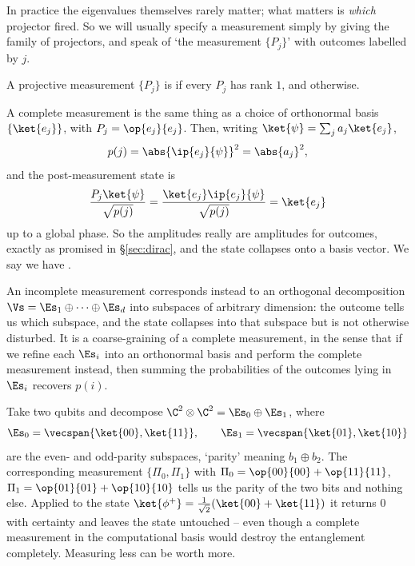 In practice the eigenvalues themselves rarely matter; what matters is \emph{which} projector fired. So we will usually specify a measurement simply by giving the family of projectors, and speak of `the measurement $\{P_j\}$' with outcomes labelled by $j$.

\begin{definition}
	A projective measurement $\{P_j\}$ is  if every $P_j$ has rank $1$, and  otherwise.
\end{definition}

A complete measurement is the same thing as a choice of orthonormal basis $\{\ket{e_j}\}$, with $P_j = \op{e_j}{e_j}$. Then, writing $\ket{\psi} = \sum_j a_j\ket{e_j}$,
$$p(j) = \abs{\ip{e_j}{\psi}}^2 = \abs{a_j}^2,$$
and the post-measurement state is
$$\frac{P_j\ket{\psi}}{\sqrt{p(j)}} = \frac{\ket{e_j}\ip{e_j}{\psi}}{\sqrt{p(j)}} = \ket{e_j}$$
up to a global phase. So the amplitudes really are amplitudes for outcomes, exactly as promised in \S\ref{sec:dirac}, and the state collapses onto a basis vector. We say we have .

An incomplete measurement corresponds instead to an orthogonal decomposition $\Vs = \Es_1 \oplus \cdots \oplus \Es_d$ into subspaces of arbitrary dimension: the outcome tells us which subspace, and the state collapses into that subspace but is not otherwise disturbed. It is a coarse-graining of a complete measurement, in the sense that if we refine each $\Es_i$ into an orthonormal basis and perform the complete measurement instead, then summing the probabilities of the outcomes lying in $\Es_i$ recovers $p(i)$.

\begin{example}
	Take two qubits and decompose $\C^2\otimes\C^2 = \Es_0 \oplus \Es_1$, where
	$$\Es_0 = \vecspan\{\ket{00},\ket{11}\}, \qquad \Es_1 = \vecspan\{\ket{01},\ket{10}\}$$
	are the even- and odd-parity subspaces, `parity' meaning $b_1 \oplus b_2$. The corresponding measurement $\{\Pi_0, \Pi_1\}$ with $\Pi_0 = \op{00}{00}+\op{11}{11}$, $\Pi_1 = \op{01}{01}+\op{10}{10}$ tells us the parity of the two bits and nothing else. Applied to the state $\ket{\phi^+} = \tfrac{1}{\sqrt2}(\ket{00}+\ket{11})$ it returns $0$ with certainty and leaves the state untouched -- even though a complete measurement in the computational basis would destroy the entanglement completely. Measuring less can be worth more.
\end{example}


